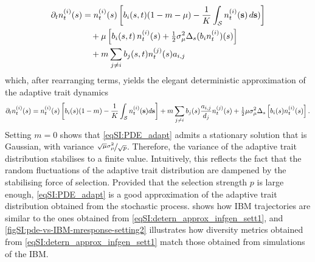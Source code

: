%
\begin{equation}
  \begin{split}
    \partial_t n_t^{(i)}(s) &= n_t^{(i)}(s)\left[b_i(s,t)(1-m - \mu) - \frac{1}{K} \int_\mathcal{S} n_t^{(i)}({\textbf s}) \, d {\textbf s})\right] \\
    & \quad + \mu \left[ b_i(s,t) \, n_t^{(i)}(s) + \tfrac{1}{2} \sigma_\mu^2 \Delta_s (b_i n_t^{(i)})(s) \right] \\
    & \quad + m \sum_{j \neq i} b_j(s,t) n_t^{(j)}(s) a_{i,j}
    \end{split}
\end{equation}
which, after rearranging terms, yields the elegant deterministic approximation of the adaptive trait dynamics
%
\begin{equation}\label{eqSI:PDE_adapt}
  \partial_t n_t^{(i)}(s) =n_t^{(i)} (s) \left[b_i(s)(1-m) -  \frac{1}{K}\int_\mathcal{S}  n_t^{(i)}({\textbf s}) d{\textbf s}  \right] + m \sum_{j\neq i} b_j(s) \frac{a_{i,j}}{d_j} n_t^{(j)}(s) + \tfrac{1}{2} \mu \sigma_\mu^2 \Delta_s \left[ b_i(s) n^{(i)}_t(s) \right].
\end{equation}
%
Setting $m = 0$ \cite{Mirrahimi2020} shows that \cref{eqSI:PDE_adapt} admits a stationary solution that is Gaussian, with variance $ \nicefrac{\sqrt{\mu} \sigma_\mu^2}{\sqrt{p}}$. 
%
Therefore, the variance of the adaptive trait distribution stabilises to a finite value. Intuitively, this reflects the fact that the random fluctuations of the adaptive trait distribution are dampened by the stabilising force of selection. Provided that the selection strength $p$ is large enough, \cref{eqSI:PDE_adapt} is a good approximation of the adaptive trait distribution obtained from the stochastic process.
%
 shows how IBM trajectories are similar to the ones obtained from \cref{eqSI:detern_approx_infgen_sett1}, and \cref{figSI:pde-vs-IBM-mresponse-setting2} illustrates how diversity metrics obtained from \cref{eqSI:detern_approx_infgen_sett1} match those obtained from simulations of the IBM.


